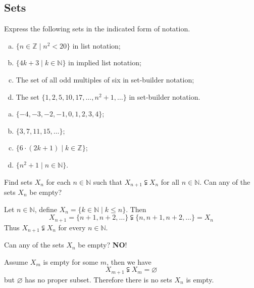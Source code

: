 \subsection*{Sets}

\begin{chapex}
Express the following sets in the indicated form of notation.
\begin{enumerate}[(a)]
\item $\{ n \in \mathbb{Z} \mid n^2 < 20 \}$ in list notation;
\item $\{ 4k+3 \mid k \in \mathbb{N} \}$ in implied list notation;
\item The set of all odd multiples of six in set-builder notation;
\item The set $\{ 1, 2, 5, 10, 17, \dots, n^2+1, \dots \}$ in set-builder notation.
\end{enumerate}
\end{chapex}

\begin{mysolution}
    \begin{enumerate}[(a)]
    \item $\{-4, -3, -2, -1, 0, 1, 2, 3, 4\}$;
    \item $\{ 3, 7, 11, 15, \dots \}$;
    \item $\{6 \cdot (2k+1) \mid k \in \mathbb{Z}\}$;
    \item $\{ n^2+1 \mid n \in \mathbb{N} \}$.
    \end{enumerate}
\end{mysolution}

\begin{chapex}
Find sets $X_n$ for each $n \in \mathbb{N}$ such that $X_{n+1} \subsetneqq X_n$ for all $n \in \mathbb{N}$. Can any of the sets $X_n$ be empty?
\end{chapex}

\begin{mysolution}
    Let $n \in \mathbb{N}$, define $X_n = \{k \in \mathbb{N} \mid k \leq n\}$. Then
    \[X_{n+1} = \{n+1, n+2, \dots\} \subsetneqq \{n, n+1, n+2, \dots\} = X_n\]
    Thus $X_{n+1} \subsetneqq X_n$ for every $n \in \mathbb{N}$.

    Can any of the sets $X_n$ be empty? \textbf{NO}! 

    Assume $X_m$ is empty for some $m$, then we have
    \[X_{m+1} \subsetneqq X_m = \varnothing\]
    but $\varnothing$ has no proper subset. Therefore there is no sets $X_n$ is empty.
\end{mysolution}

